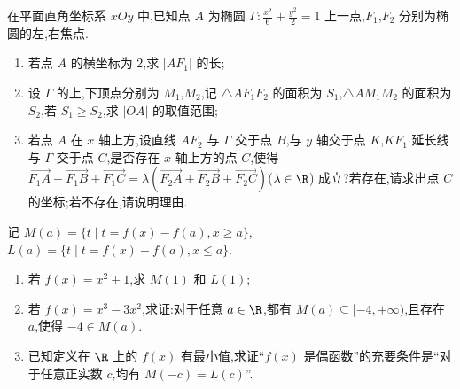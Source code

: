 \begin{problem}
在平面直角坐标系 \(xOy\) 中,已知点 \(A\) 为椭圆 \(\Gamma:\frac{x^2}{6}+\frac{y^2}{2}=1\) 上一点,\(F_1\),\(F_2\) 分别为椭圆的左,右焦点.

\begin{enumerate}
\item 若点 \(A\) 的横坐标为 \(2\),求 \(\left|AF_1\right|\) 的长;
\item 设 \(\Gamma\) 的上,下顶点分别为 \(M_1\),\(M_2\),记 \(\triangle AF_1F_2\) 的面积为 \(S_1\),\(\triangle AM_1M_2\) 的面积为 \(S_2\),若 \(S_1\ge S_2\),求 \(\left|OA\right|\) 的取值范围;
\item 若点 \(A\) 在 \(x\) 轴上方,设直线 \(AF_2\) 与 \(\Gamma\) 交于点 \(B\),与 \(y\) 轴交于点 \(K\),\(KF_1\) 延长线与 \(\Gamma\) 交于点 \(C\),是否存在 \(x\) 轴上方的点 \(C\),使得 \(\overrightarrow{F_1A}+\overrightarrow{F_1B}+\overrightarrow{F_1C} =\lambda\left(\overrightarrow{F_2A}+\overrightarrow{F_2B}+\overrightarrow{F_2C}\right)\)(\(\lambda\in\R\))
成立?若存在,请求出点 \(C\) 的坐标;若不存在,请说明理由.
\end{enumerate}
\end{problem}

\begin{problem}
记 \(M(a)=\{t\mid t=f(x)-f(a),x\ge a\}\),\(L(a)=\{t\mid t=f(x)-f(a),x\le a\}\).

\begin{enumerate}
\item 若 \(f(x)=x^2+1\),求 \(M(1)\) 和 \(L(1)\);
\item 若 \(f(x)=x^3-3x^2\),求证:对于任意 \(a\in\R\),都有 \(M(a)\subseteq[-4,+\infty)\),且存在 \(a\),使得 \(-4\in M(a)\).
\item 已知定义在 \(\R\) 上的 \(f(x)\) 有最小值,求证``\(f(x)\) 是偶函数''的充要条件是``对于任意正实数 \(c\),均有 \(M(-c)=L(c)\)''.
\end{enumerate}
\end{problem}

